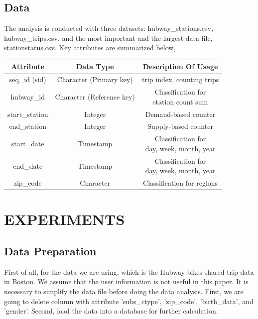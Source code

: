 \documentclass[journal, letterpaper]{IEEEtran}
\begin{document}
\subsection{Data}
The analysis is conducted with three datasets: hubway\_stations.csv, hubway\_trips.csv, and the most important and the largest data file, stationstatus.csv. Key attributes are summarized below, 
\begin{table}[ht]
\centering %
\begin{tabular}{c| c| c} %
\hline\hline %
Attribute & Data Type & Description Of Usage  \\  %
\hline %
seq\_id (sid) & Character (Primary key) & trip index, counting trips  \\ %
\hline
hubway\_id & Character (Reference key) & \pbox{20cm}{Classification for \\ station count sum}  \\
\hline
start\_station & Integer & Demand-based counter  \\
\hline
end\_station & Integer & Supply-based counter   \\
\hline
start\_date & Timestamp & \pbox{20cm}{Classification for \\ day, week, month, year}  \\  %
\hline
end\_date & Timestamp & \pbox{20cm}{Classification for \\ day, week, month, year} \\
\hline
zip\_code & Character & Classification for regions \\
\hline %
\end{tabular}
\label{table:nonlin} %
\end{table}

\section{EXPERIMENTS}
\large
\subsection{Data Preparation}
First of all, for the data we are using, which is the Hubway bikes shared trip data in Boston. We assume that the user information is not useful in this paper. It is necessary to simplify the data file before doing the data analysis. First, we are going to delete column with attribute 'subs\_ctype', 'zip\_code', 'birth\_data', and 'gender'. Second, load the data into a database for further calculation. 
\end{document}
